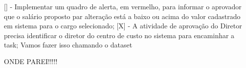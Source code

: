 [] - Implementar um quadro de alerta, em vermelho, para informar o aprovador que o salário proposto par alteração está a baixo ou  acima do valor cadastrado em sistema para o cargo selecionado;
[X] - A atividade de aprovação do Diretor precisa identificar o diretor do centro de custo no sistema para encaminhar a task; Vamos fazer isso chamando o dataset

ONDE PAREI!!!!!

    